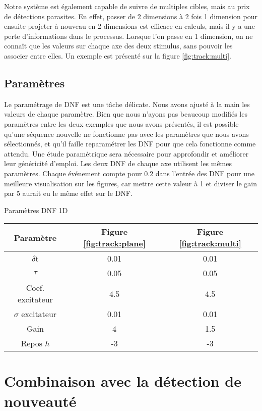 	Notre système est également capable de suivre de multiples cibles, mais au prix de détections parasites. En effet, passer de 2 dimensions à 2 fois 1 dimension pour ensuite projeter à nouveau en 2 dimensions est efficace en calculs, mais il y a une perte d'informations dans le processus. Lorsque l'on passe en 1 dimension, on ne connaît que les valeurs sur chaque axe des deux stimulus, sans pouvoir les associer entre elles. Un exemple est présenté sur la figure \ref{fig:track:multi}.

	\subsection{Paramètres}

	Le paramétrage de DNF est une tâche délicate. Nous avons ajusté à la main les valeurs de chaque paramètre. Bien que nous n'ayons pas beaucoup modifiés les paramètres entre les deux exemples que nous avons présentés, il est possible qu'une séquence nouvelle ne fonctionne pas avec les paramètres que nous avons sélectionnés, et qu'il faille reparamétrer les DNF pour que cela fonctionne comme attendu. Une étude paramétrique sera nécessaire pour approfondir et améliorer leur généricité d'emploi. Les deux DNF de chaque axe utilisent les mêmes paramètres. Chaque événement compte pour 0.2 dans l'entrée des DNF pour une meilleure visualisation sur les figures, car mettre cette valeur à 1 et diviser le gain par 5 aurait eu le même effet sur le DNF.


	\begin{tableth}
	\label{tab:recap:param}
	\caption[Paramètres DNF 1D]{Paramètres DNF 1D}
	\begin{tabular}{|c|cc|}
		\hline
		Paramètre & Figure \ref{fig:track:plane} & Figure \ref{fig:track:multi}\\
		\hline
		$\delta$t & 0.01 & 0.01\\
		$\tau$ & 0.05 & 0.05\\
		Coef. excitateur & 4.5 & 4.5\\
		$\sigma$ excitateur & 0.01 & 0.01\\
		Gain & 4 & 1.5\\
		Repos $h$ & -3 & -3\\
		\hline
	\end{tabular}
	\end{tableth}

	\newpage

	\section{Combinaison avec la détection de nouveauté}

